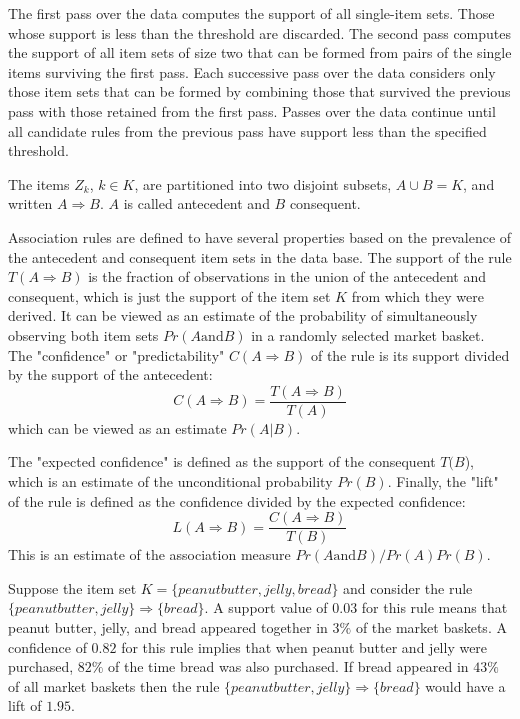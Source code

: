 \documentclass[12pt, letterpaper]{article}
\theoremstyle{definition}
\begin{document}
The first pass over the data computes the support of all single-item sets. Those whose support is less than the threshold are discarded. The second pass computes the support of all item sets of size two that can be formed from pairs of the single items surviving the first pass. Each successive pass over the data considers only those item sets that can be formed by combining those that survived the previous pass with those retained from the first pass. Passes over the data continue until all candidate rules from the previous pass have support less than the specified threshold.

The items $Z_k$, $k \in K$, are partitioned into two disjoint subsets, $A \cup B = K$, and written $A\Rightarrow B$. $A$ is called antecedent and $B$ consequent.

Association rules are defined to have several properties based on the prevalence of the antecedent and consequent item sets in the data base. The support of the rule $T(A\Rightarrow B)$ is the fraction of observations in the union of the antecedent and consequent, which is just the support of the item set $K$ from which they were derived. It can be viewed as an estimate of the probability of simultaneously observing both item sets $Pr(A \text{and} B)$ in a randomly selected market basket. The "confidence" or "predictability" $C(A\Rightarrow B)$ of the rule is its support divided by the support of the antecedent:
\begin{equation}
C(A\Rightarrow B) = \frac{T(A\Rightarrow B)}{T(A)}
\end{equation}
which can be viewed as an estimate $Pr(A|B)$.

The "expected confidence" is defined as the support of the consequent $T(B$), which is an estimate of the unconditional probability $Pr(B)$. Finally, the "lift" of the rule is defined as the confidence divided by the expected confidence:
\begin{equation}
L(A\Rightarrow B) = \frac{C(A\Rightarrow B)}{T(B)}
\end{equation}
This is an estimate of the association measure $Pr(A \text{and} B)/Pr(A)Pr(B)$.

Suppose the item set $K = \{peanut butter, jelly, bread\}$ and consider the rule $\{peanut butter, jelly\} \Rightarrow \{bread\}$. A support value of $0.03$ for this rule means that peanut butter, jelly, and bread appeared together in $3\%$ of the market baskets. A confidence of $0.82$ for this rule implies that when peanut butter and jelly were purchased, $82\%$ of the time bread was also purchased. If bread appeared in $43\%$ of all market baskets then the rule $\{peanut butter, jelly\} \Rightarrow \{bread\}$ would have a lift of $1.95$.
\end{document}

